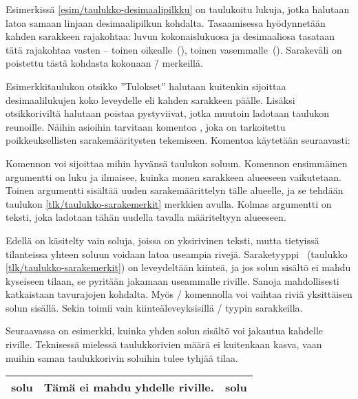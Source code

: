 Esimerkissä \ref{esim/taulukko-desimaalipilkku} on taulukoitu lukuja,
jotka halutaan latoa samaan linjaan desimaalipilkun kohdalta.
Tasaamisessa hyödynnetään kahden sarakkeen rajakohtaa: luvun
kokonaislukuosa ja desimaaliosa tasataan tätä rajakohtaa vasten --
toinen oikealle~(), toinen vasemmalle~(). Sarakeväli
on poistettu tästä kohdasta kokonaan \=/ merkeillä.

Esimerkkitaulukon otsikko ''Tulokset'' halutaan kuitenkin sijoittaa
desimaalilukujen koko leveydelle eli kahden sarakkeen päälle. Lisäksi
otsikkoriviltä halutaan poistaa pystyviivat, jotka muutoin ladotaan
taulukon reunoille. Näihin asioihin tarvitaan komentoa
, joka on tarkoitettu poikkeuksellisten
sarakemääritysten tekemiseen. Komentoa käytetään seuraavasti:

\begin{koodilohkosis}
\end{koodilohkosis}

Komennon  voi sijoittaa mihin hyvänsä taulukon
soluun. Komennon ensimmäinen argumentti  on luku ja ilmaisee,
kuinka monen sarakkeen alueeseen vaikutetaan. Toinen argumentti
 sisältää uuden sarakemäärittelyn tälle alueelle, ja
se tehdään taulukon \ref{tlk/taulukko-sarakemerkit} merkkien avulla.
Kolmas argumentti on teksti, joka ladotaan tähän uudella tavalla
määriteltyyn alueeseen.

Edellä on käsitelty vain soluja, joissa on yksirivinen teksti, mutta
tietyissä tilanteissa yhteen soluun voidaan latoa useampia rivejä.
Saraketyyppi~ (taulukko \ref{tlk/taulukko-sarakemerkit}) on
leveydeltään kiinteä, ja jos solun sisältö ei mahdu kyseiseen tilaan, se
pyritään jakamaan useammalle riville. Sanoja mahdollisesti katkaistaan
tavurajojen kohdalta. Myös \-/ komennolla voi vaihtaa
riviä yksittäisen solun sisällä. Sekin toimii vain kiinteäleveyksisillä
\-/ tyypin sarakkeilla.

Seuraavassa on esimerkki, kuinka yhden solun sisältö voi jakautua
kahdelle riville. Teknisessä mielessä taulukkorivien määrä ei kuitenkaan
kasva, vaan muihin saman taulukkorivin soluihin tulee tyhjää tilaa.

\komentoi{\keno}
\begin{koodilohkosis}
\begin{tabular}{|l|p{6.5em}|l|}
  \hline solu & Tämä ei mahdu yhdelle riville. & solu \\ \hline
\end{tabular}
\end{koodilohkosis}

